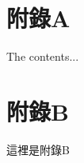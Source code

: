 
\chapter{附錄A}
\label{chapter:appendixA}
The contents...

\chapter{附錄B}
\label{chapter:appendixB}
這裡是附錄B